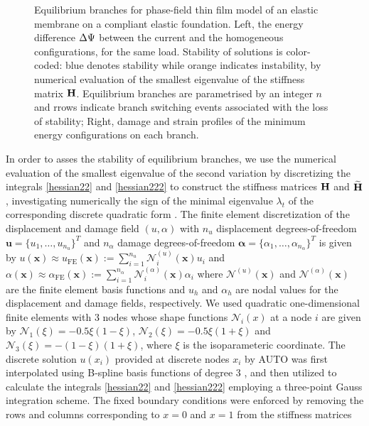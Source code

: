 \begin{figure}
    \caption{
Equilibrium branches for phase-field thin film model of an elastic membrane on a compliant elastic foundation. Left, the energy difference $\Delta \Psi$ between the current and the homogeneous configurations, for the same load. Stability of solutions is color-coded: blue denotes stability while orange indicates instability, by numerical evaluation of the smallest eigenvalue of the stiffness matrix $\mathbf{H}$. Equilibrium branches are parametrised by an integer $n$ and rrows indicate branch switching events associated with the loss of stability; Right, damage and strain profiles of the minimum energy configurations on each branch.}
    \label{fig:branches-stiff}
\end{figure}
In order to asses the stability of equilibrium branches, we use  the numerical evaluation of the smallest eigenvalue of the second variation by discretizing the integrals \eqref{hessian22} and   \eqref{hessian222} to construct the stiffness matrices
$\mathbf{H}$ and $\widetilde{\mathbf{H}}$, investigating numerically the sign of the minimal eigenvalue $\lambda_t$ of the corresponding discrete quadratic form \cite{Sanderson2016-ht}.  The finite element discretization of the displacement and damage field $(u, \alpha )$     with \( n_u \) displacement degrees-of-freedom 
$
\mathbf{u} = \{ u_1, \ldots, u_{n_u} \}^T 
$
and \( n_\alpha \) damage degrees-of-freedom 
$
\boldsymbol{\alpha} = \{ \alpha_1, \ldots, \alpha_{n_\alpha} \}^T
$ is given by 
$
u(\mathbf{x}) \approx u_{\text{FE}} (\mathbf{x}) := \sum_{i=1}^{n_u} \mathcal{N}^{(u)}_i(\mathbf{x}) u_i $
and $\alpha(\mathbf{x}) \approx \alpha_{\text{FE}} (\mathbf{x}) := \sum_{i=1}^{n_\alpha} \mathcal{N}^{(\alpha)}_i (\mathbf{x}) \alpha_i 
$
where $\mathcal{N}^{(u)}(\mathbf{x}) $ and $\mathcal{N}^{(\alpha)}(\mathbf{x}) $ are the finite element basis functions and  $u_h$ and  $\alpha_h$ are nodal values for the displacement and damage fields, respectively. We used quadratic one-dimensional finite elements with 3 nodes  whose   shape functions   ${\mathcal N}_i(x)$ at a node $i$  are given by ${\mathcal N}_1(\xi)=-0.5\xi(1-\xi)$, ${\mathcal N}_2(\xi)=-0.5\xi(1+\xi)$ and ${\mathcal N}_3(\xi)=-(1-\xi)(1+\xi)$, where $\xi$ is the isoparameteric coordinate. The discrete solution $u(x_i)$ provided at discrete nodes $x_i$ by AUTO was first interpolated using B-spline basis functions of degree 3 \cite{Grimstad2016-cq}, and then utilized to calculate the integrals \eqref{hessian22} and \ref{hessian222} employing a three-point Gauss integration scheme. The fixed boundary conditions were enforced by removing the rows and columns corresponding to $x = 0$ and $x = 1$ from the stiffness matrices 
